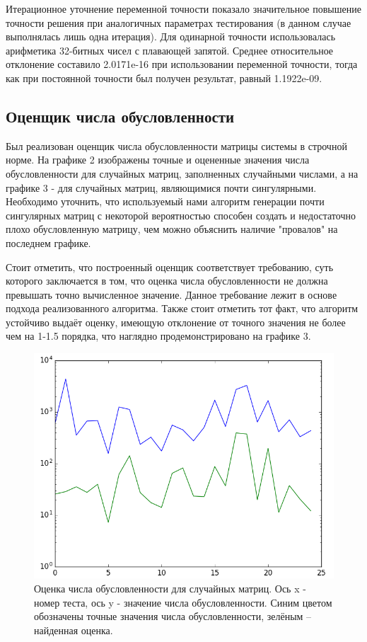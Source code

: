 Итерационное уточнение переменной точности показало значительное повышение точности решения при аналогичных параметрах тестирования (в данном случае выполнялась лишь одна итерация). Для одинарной точности использовалась арифметика 32-битных чисел с плавающей запятой. Среднее относительное отклонение составило 2.0171e-16 при использовании переменной точности, тогда как при постоянной точности был получен результат, равный 1.1922e-09.


\subsection{Оценщик числа обусловленности}
Был реализован оценщик числа обусловленности матрицы системы в строчной норме. На графике 2 изображены точные и оцененные значения числа обусловленности для случайных матриц, заполненных случайными числами, а на графике 3 - для случайных матриц, являющимися почти сингулярными. 
Необходимо уточнить, что используемый нами алгоритм генерации почти сингулярных матриц с некоторой вероятностью способен создать и недостаточно плохо обусловленную матрицу, чем можно объяснить наличие "провалов" на последнем графике. 

Стоит отметить, что построенный оценщик соответствует требованию, суть которого заключается в том, что оценка числа обусловленности не должна превышать точно вычисленное значение. Данное требование лежит в основе подхода реализованного алгоритма. Также стоит отметить тот факт, что алгоритм устойчиво выдаёт оценку, имеющую отклонение от точного значения не более чем на 1-1.5 порядка, что наглядно продемонстрировано на графике 3. 

\begin{figure}[ht]
\includegraphics[width=\textwidth,height=\textheight,keepaspectratio]{figure_2_cropped}
\caption{Оценка числа обусловленности для случайных матриц. Ось x - номер теста, ось y - значение числа обусловленности. Синим цветом обозначены точные значения числа обусловленности, зелёным – найденная оценка. }
\end{figure}

